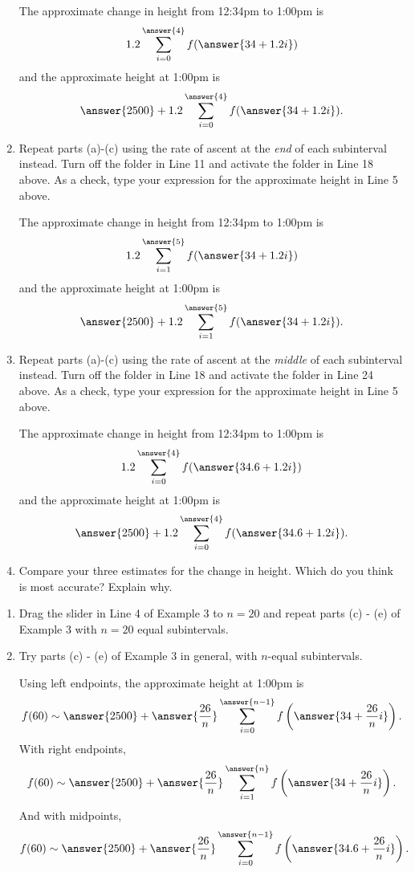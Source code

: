 \documentclass{ximera}
\begin{document}
\begin{example}
\begin{enumerate}
The approximate change in height from 12:34pm to 1:00pm is
\[
  1.2 \sum_{i=0}^{\answer{4}} f(\answer{34 + 1.2i})  
\]
and the approximate height at 1:00pm is
\[
     \answer{2500} + 1.2 \sum_{i=0}^{\answer{4}} f(\answer{34 + 1.2i})  .
\]

\item Repeat parts (a)-(c) using the rate of ascent at the \emph{end} of each subinterval instead. Turn off the folder in Line 11 and activate the folder in Line 18 above. As a check, type your expression for the approximate height in Line 5 above.

The approximate change in height from 12:34pm to 1:00pm is
\[
  1.2 \sum_{i=1}^{\answer{5}} f(\answer{34 + 1.2i})  
\]
and the approximate height at 1:00pm is
\[
     \answer{2500} + 1.2 \sum_{i=1}^{\answer{5}} f(\answer{34 + 1.2i})  .
\]

\item Repeat parts (a)-(c) using the rate of ascent at the \emph{middle} of each subinterval instead. Turn off the folder in Line 18 and activate the folder in Line 24 above. As a check, type your expression for the approximate height in Line 5 above.

The approximate change in height from 12:34pm to 1:00pm is
\[
  1.2 \sum_{i=0}^{\answer{4}} f(\answer{34.6+ 1.2i})  
\]
and the approximate height at 1:00pm is
\[
     \answer{2500} + 1.2 \sum_{i=0}^{\answer{4}} f(\answer{34.6 + 1.2i})  .
\]

\item Compare your three estimates for the change in height. Which do you think is most accurate? Explain why.

\end{enumerate}
\end{example} 

\begin{example}  \label{Ex:IjdRJrehreDF}
\begin{enumerate}
\item  Drag the slider in Line 4 of Example 3 to $n=20$ and repeat parts (c) - (e) of Example 3 with $n=20$ equal subintervals. 

\item Try parts (c) - (e) of Example 3 in general, with $n$-equal subintervals.

Using left endpoints, the approximate height at 1:00pm is
\[
        f(60) \sim   \answer{2500} +  \answer{\frac{26}{n}} \sum_{i=0}^{\answer{n-1}} f\left(\answer{34+ \frac{26}{n}i}\right)  .
\]
With right endpoints,
\[
        f(60) \sim   \answer{2500} +  \answer{\frac{26}{n}} \sum_{i=1}^{\answer{n}} f\left(\answer{34+ \frac{26}{n}i}\right)  .
\]
And with midpoints,
\[
        f(60) \sim   \answer{2500} +  \answer{\frac{26}{n}} \sum_{i=0}^{\answer{n-1}} f\left(\answer{34.6+ \frac{26}{n}i}\right)  .
\]

\end{enumerate}
\end{example}
\end{document}
